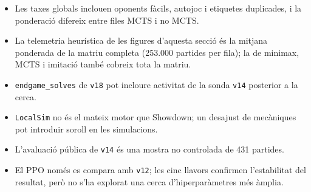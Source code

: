 \begin{itemize}
    \item Les taxes globals inclouen oponents fàcils, autojoc i etiquetes duplicades, i la ponderació difereix entre files MCTS i no MCTS.
    \item La telemetria heurística de les figures d'aquesta secció és la mitjana ponderada de la matriu completa (253.000 partides per fila); la de minimax, MCTS i imitació també cobreix tota la matriu.
    \item \texttt{endgame\_solves} de \texttt{v18} pot incloure activitat de la sonda \texttt{v14} posterior a la cerca.
    \item \texttt{LocalSim} no és el mateix motor que Showdown; un desajust de mecàniques pot introduir soroll en les simulacions.
    \item L'avaluació pública de \texttt{v14} és una mostra no controlada de 431 partides.
    \item El PPO només es compara amb \texttt{v12}; les cinc llavors confirmen l'estabilitat del resultat, però no s'ha explorat una cerca d'hiperparàmetres més àmplia.
\end{itemize}
